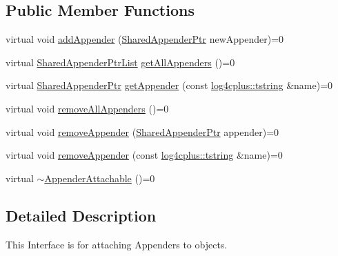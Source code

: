\subsection*{Public Member Functions}
\begin{DoxyCompactItemize}
\item 
virtual void \hyperlink{classlog4cplus_1_1spi_1_1AppenderAttachable_a5898afeee7a25a6f5e3f8beee38e5bc8}{add\-Appender} (\hyperlink{namespacelog4cplus_a12d841b842c72396be9219ce67a0c215}{Shared\-Appender\-Ptr} new\-Appender)=0
\item 
virtual \hyperlink{namespacelog4cplus_a97158ac12736f649c5477d7b63f51ede}{Shared\-Appender\-Ptr\-List} \hyperlink{classlog4cplus_1_1spi_1_1AppenderAttachable_a68112eec2b47d9982ff2b108f8a52e6f}{get\-All\-Appenders} ()=0
\item 
virtual \hyperlink{namespacelog4cplus_a12d841b842c72396be9219ce67a0c215}{Shared\-Appender\-Ptr} \hyperlink{classlog4cplus_1_1spi_1_1AppenderAttachable_a4bb99feca3d0ea2a88a8b39ebcb713c8}{get\-Appender} (const \hyperlink{namespacelog4cplus_a3c9287f6ebcddc50355e29d71152117b}{log4cplus\-::tstring} \&name)=0
\item 
virtual void \hyperlink{classlog4cplus_1_1spi_1_1AppenderAttachable_a3888c07c99a3d89c0da55b1c39b282c0}{remove\-All\-Appenders} ()=0
\item 
virtual void \hyperlink{classlog4cplus_1_1spi_1_1AppenderAttachable_af199577b3a562aa5857f25255d4bb04b}{remove\-Appender} (\hyperlink{namespacelog4cplus_a12d841b842c72396be9219ce67a0c215}{Shared\-Appender\-Ptr} appender)=0
\item 
virtual void \hyperlink{classlog4cplus_1_1spi_1_1AppenderAttachable_adf86f941e47a7c400a75408bf42e80ac}{remove\-Appender} (const \hyperlink{namespacelog4cplus_a3c9287f6ebcddc50355e29d71152117b}{log4cplus\-::tstring} \&name)=0
\item 
virtual \hyperlink{classlog4cplus_1_1spi_1_1AppenderAttachable_a09d4f5deedba58d4c86e712160209f00}{$\sim$\-Appender\-Attachable} ()=0
\end{DoxyCompactItemize}


\subsection{Detailed Description}
This Interface is for attaching Appenders to objects. 

